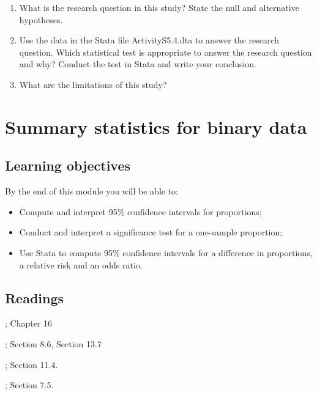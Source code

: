 \documentclass[
]{memoir}
\providecommand{\tightlist}{%
  \setlength{\itemsep}{0pt}\setlength{\parskip}{0pt}}
\begin{document}
\begin{enumerate}
\def\labelenumi{\alph{enumi})}
\tightlist
\item
  What is the research question in this study? State the null and alternative hypotheses.
\item
  Use the data in the Stata file ActivityS5.4.dta to answer the research question. Which statistical test is appropriate to answer the research question and why? Conduct the test in Stata and write your conclusion.
\item
  What are the limitations of this study?
\end{enumerate}

\hypertarget{summary-statistics-for-binary-data}{%
\chapter{Summary statistics for binary data}\label{summary-statistics-for-binary-data}}

\hypertarget{learning-objectives-5}{%
\section*{Learning objectives}\label{learning-objectives-5}}

By the end of this module you will be able to:

\begin{itemize}
\tightlist
\item
  Compute and interpret 95\% confidence intervals for proportions;
\item
  Conduct and interpret a significance test for a one-sample proportion;
\item
  Use Stata to compute 95\% confidence intervals for a difference in proportions, a relative risk and an odds ratio.
\end{itemize}

\hypertarget{readings-5}{%
\section*{Readings}\label{readings-5}}

\citet{kirkwood_sterne01a}; Chapter 16

\citet{bland15b}; Section 8.6, Section 13.7

\citet{juul_frydenberg14}; Section 11.4.

\citet{acock10}; Section 7.5.
\end{document}
